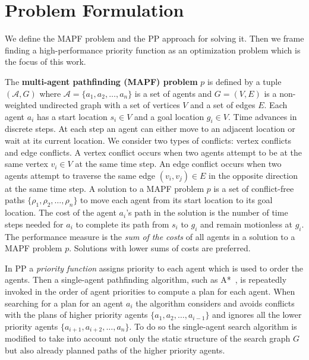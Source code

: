 \documentclass[letterpaper]{article}
\begin{document}
\section{Problem Formulation}
\label{sec:problemFormulation}

We define the MAPF problem and the PP approach for solving it. Then we frame finding a high-performance priority function as an optimization problem which is the focus of this work.

The \textbf{multi-agent pathfinding (MAPF) problem} $ p $ is defined by a tuple $ (\mathcal{A}, G) $ where $ \mathcal{A} = \{a_1, a_2, \dots, a_n\} $ is a set of agents and $ G = (V, E) $ is a non-weighted undirected graph with a set of vertices $ V $ and a set of edges $ E $. Each agent $ a_i $ has a start location $ s_i \in V $ and a goal location $ g_i \in V $. Time advances in discrete steps. At each step an agent can either move to an adjacent location or wait at its current location. We consider two types of conflicts: vertex conflicts and edge conflicts. A vertex conflict occurs when two agents attempt to be at the same vertex $ v_i \in V $ at the same time step. An edge conflict occurs when two agents attempt to traverse the same edge $ (v_i, v_j) \in E $ in the opposite direction at the same time step. A solution to a MAPF problem $ p $ is a set of conflict-free paths $ \{\rho_1, \rho_2, \dots, \rho_n\} $ to move each agent from its start location to its goal location. The cost of the agent $ a_i $'s path in the solution is the number of time steps needed for $ a_i $ to complete its path from $ s_i $ to $ g_i $ and remain motionless at $ g_i $. The performance measure is the {\em sum of the costs} of all agents in a solution to a MAPF problem $ p $. Solutions with lower sums of costs are preferred.

In PP a \emph{priority function} assigns priority to each agent which is used to order the agents. Then a single-agent pathfinding algorithm, such as A*~\citep{AStar}, is repeatedly invoked in the order of agent priorities to compute a plan for each agent. When searching for a plan for an agent $ a_i $ the algorithm considers and avoids conflicts with the plans of higher priority agents $ \{a_1, a_2, \dots, a_{i - 1}\} $ and ignores all the lower priority agents $ \{a_{i + 1}, a_{i+2}, \dots, a_n\} $. To do so the single-agent search algorithm is modified to take into account not only the static structure of the search graph $ G $ but also already planned paths of the higher priority agents.
\end{document}
